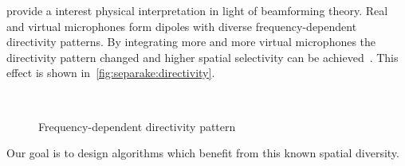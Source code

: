  provide a interest physical interpretation in light of beamforming theory.
Real and virtual microphones form dipoles with diverse frequency-dependent directivity patterns.
By integrating more and more virtual microphones the directivity pattern changed and higher spatial selectivity can be achieved~.
This effect is shown in~\cref{fig:separake:directivity}.
\begin{figure}[h]
    \begin{fullwidth}
    \centering
    \\
    \label{fig:separake:results}
    \caption{Frequency-dependent directivity pattern }
    \end{fullwidth}
\end{figure}
Our goal is to design algorithms which benefit from this known spatial diversity.

